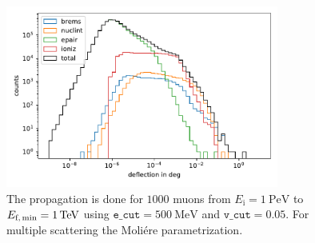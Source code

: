 \begin{figure}
    \centering 
    \includegraphics[width=0.8\textwidth]{figures/1PeV_1TeV_1000events.pdf}
    \caption{The propagation is done for $\num{1000}$ 
    muons from $E_{\text{i}} = \SI{1}{\peta\electronvolt}$ to $E_{\text{f,\,min}} = \SI{1}{\tera\electronvolt}$ using $\texttt{e\_cut} = \SI{500}{\mega\electronvolt}$ and $\texttt{v\_cut} = 0.05$. For multiple scattering 
    the Moliére parametrization.}
    \label{fig:defl_per_int}
\end{figure}

